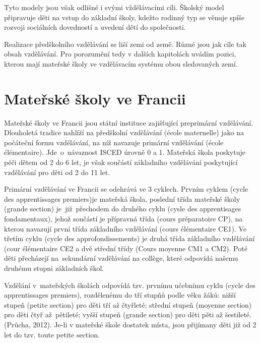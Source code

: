 		Tyto modely jsou však odlišné i svými vždělávacími cíli. Školský model připravuje děti na vstup do základní školy, kdežto rodinný typ se věnuje spíše rozvoji sociálních dovedností a uvedení dětí do společnosti.

		Realizace předškolního vzdělávání se liší zemi od země. Různé jsou jak cíle tak obsah vzdělávání. Pro porozumění tedy v dalších kapitolách uvádím pozici, kterou mají mateřské školy ve vzdělávacím systému obou sledovaných zemí. 
		

	\section{Mateřské školy ve Francii}
		Mateřské školy ve Francii jsou státní instituce zajišťující preprimární vzdělávání. Dlouholetá tradice nahlíží na předškolní vzdělávání (école maternelle) jako na počáteční formu vzdělávání, na níž navazuje primární vzdělávání (école élémentaire). Jde o návaznost ISCED  úrovně 0 a 1. Mateřská škola poskytuje péči dětem od 2 do 6 let, je však součástí základního vzdělávání poskytující vzdělávání pro děti od 2 do 11 let.

		Primární vzdělávání ve Francii se odehrává ve 3 cyklech. Prvním cyklem (cycle des apprentissages premiers)je mateřská škola, poslední třída mateřské školy (grande section) je již přechodem do druhého cyklu (cysle des apprentisages fondamentaux), jehož součástí je přípravná třída (cours préparatoire CP), na kterou navazují první třída základního vzdělávání (cours élémentaire CE1). Ve třetím cyklu (cycle des approfondissements) je druhá třída základního vzdělávání (cour élémentaire CE2 a dvě střední třídy (Cours moyenne CM1 a CM2). Poté děti přecházejí na sekundární vzdělávání na collège, které odpovídá našemu druhému stupni základních škol. 

		Vzdělání v mateřských školách odpovídá tzv. prvnímu učebnímu cyklu (cycle des apprentissages premiers), rozdělenému do tří stupňů podle věku žáků: nižší stupeň (petite section) pro děti tří až čtyřleté; střední stupeň (moyenne section) pro děti čtyř až pětileté; vyšší stupeň (grande section) pro děti pěti až šestileté.
		(Průcha, 2012). 
		Je-li v mateřské škole dostatek místa, jsou přijímany děti již od 2 let do tzv. toute petite section. 

